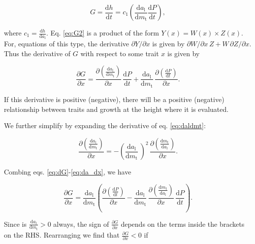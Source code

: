 \documentclass[12pt, a4paper]{article}
\begin{document}
\begin{equation} \label{eq:G2}
G = \frac{\textrm{d}h}{\textrm{d}t} = c_1   \left(\frac{\textrm{d}a_\textrm{l}} {\textrm{d}m_\textrm{t}}  \frac{ \textrm{d}P} {\textrm{d}t} \right),
\end{equation}

where \(c_1 = \frac{\textrm{d}h}{\textrm{d}a_\textrm{l}}\). Eq.
\ref{eq:G2} is a product of the form \(Y(x) = W(x) \times Z(x)\). For,
equations of this type, the derivative \(\partial{Y}/\partial{x}\) is
given by \(\partial{W}/\partial{x} \, Z + W \, \partial{Z}/\partial{x}\). Thus
the derivative of \(G\) with respect to some trait $x$  is given by

\begin{equation} \label{eq:dG}
\frac{\partial G} {\partial x} =
\frac{\partial \left(\frac{\textrm{d}a_\textrm{l}} {\textrm{d}m_\textrm{t}}\right)}{\partial x}
 \, \frac{ \textrm{d}P} {\textrm{d}t}
+ \frac{\textrm{d}a_\textrm{l}} {\textrm{d}m_\textrm{t}}
\, \frac{\partial \left( \frac{ \textrm{d}P} {\textrm{d}t}\right)}{\partial x}.
\end{equation}

If this derivative is positive (negative), there will be a positive (negative) relationship
between traits and growth at the height where it is evaluated.

We further simplify by expanding the derivative of eq. \ref{eq:daldmt}:

\begin{equation} \label{eq:da_dx}
\frac{\partial \left(\frac{\textrm{d}a_\textrm{l}} {\textrm{d}m_\textrm{t}}\right)}
{\partial x} = -\left(\frac{\textrm{d}a_\textrm{l}} {\textrm{d}m_\textrm{t}}\ \right)^2
\, \frac{\partial \left(\frac{\textrm{d}m_\textrm{t}} {\textrm{d}a_\textrm{l}}\right)
}{\partial x}.
\end{equation}

Combing eqs. \ref{eq:dG}-\ref{eq:da_dx}, we have

\begin{equation} \label{eq:dG2}
\frac{\partial G} {\partial x} =
\frac{\textrm{d}a_\textrm{l}} {\textrm{d}m_\textrm{t}}
\left(
\frac{\partial \left( \frac{ \textrm{d}P} {\textrm{d}t}\right)}{\partial x}
- \frac{\textrm{d}a_\textrm{l}} {\textrm{d}m_\textrm{t}}
\,  \frac{\partial \left(\frac{\textrm{d}m_\textrm{t}} {\textrm{d}a_\textrm{l}}\right)
}{\partial x}
 \, \frac{ \textrm{d}P} {\textrm{d}t}
\right).
\end{equation}

Since is $\frac{\textrm{d}a_\textrm{l}} {\textrm{d}m_\textrm{t}}>0$ always, the sign
of $\frac{\partial G} {\partial x}$ depends on the terms inside the brackets on the
RHS. Rearranging we find that $\frac
{\partial G} {\partial x} < 0$ if
\end{document}
